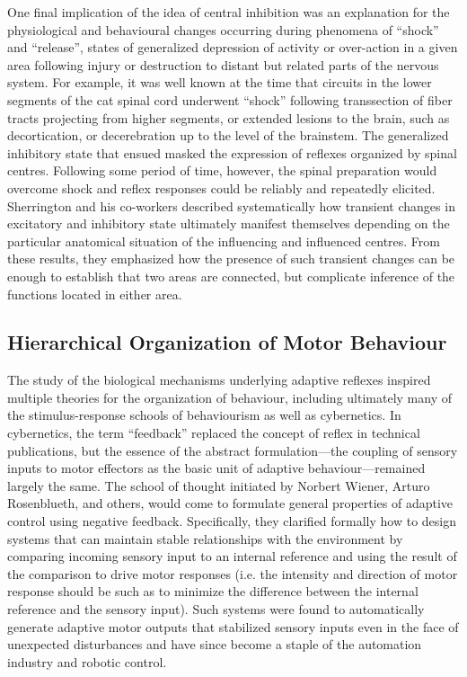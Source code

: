 One final implication of the idea of central inhibition was an explanation for the physiological and behavioural changes occurring during phenomena of ``shock'' and ``release'', states of generalized depression of activity or over-action in a given area following injury or destruction to distant but related parts of the nervous system. For example, it was well known at the time that circuits in the lower segments of the cat spinal cord underwent ``shock'' following transsection of fiber tracts projecting from higher segments, or extended lesions to the brain, such as decortication, or decerebration up to the level of the brainstem. The generalized inhibitory state that ensued masked the expression of reflexes organized by spinal centres. Following some period of time, however, the spinal preparation would overcome shock and reflex responses could be reliably and repeatedly elicited. Sherrington and his co-workers described systematically how transient changes in excitatory and inhibitory state ultimately manifest themselves depending on the particular anatomical situation of the influencing and influenced centres. From these results, they emphasized how the presence of such transient changes can be enough to establish that two areas are connected, but complicate inference of the functions located in either area.

\subsection{Hierarchical Organization of Motor Behaviour}

The study of the biological mechanisms underlying adaptive reflexes inspired multiple theories for the organization of behaviour, including ultimately many of the stimulus-response schools of behaviourism as well as cybernetics. In cybernetics, the term ``feedback'' replaced the concept of reflex in technical publications, but the essence of the abstract formulation---the coupling of sensory inputs to motor effectors as the basic unit of adaptive behaviour---remained largely the same. The school of thought initiated by Norbert Wiener, Arturo Rosenblueth, and others, would come to formulate general properties of adaptive control using negative feedback. Specifically, they clarified formally how to design systems that can maintain stable relationships with the environment by comparing incoming sensory input to an internal reference and using the result of the comparison to drive motor responses (i.e. the intensity and direction of motor response should be such as to minimize the difference between the internal reference and the sensory input). Such systems were found to automatically generate adaptive motor outputs that stabilized sensory inputs even in the face of unexpected disturbances and have since become a staple of the automation industry and robotic control.

